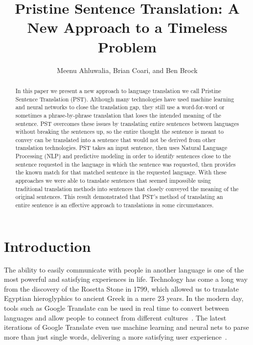 \documentclass[runningheads]{llncs}
\title{Pristine Sentence Translation: A New Approach to a Timeless Problem}
\author{
	Meenu Ahluwalia, Brian Coari, and Ben Brock
}
\institute{$^1$Master of Science in Data Science \\ Southern Methodist University \\ Dallas, Texas USA \\
	\email{\{mahluwalia, bcoari, bbrock\}@smu.edu}}
\begin{document}
	
	\maketitle
	
	\begin{abstract}
		In this paper we present a new approach to language translation we call Pristine Sentence Translation (PST). Although many technologies have used machine learning and neural networks to close the translation gap, they still use a word-for-word or sometimes a phrase-by-phrase translation that loses the intended meaning of the sentence. PST overcomes these issues by translating entire sentences between languages without breaking the sentences up, so the entire thought the sentence is meant to convey can be translated into a sentence that would not be derived from other translation technologies. PST takes an input sentence, then uses Natural Language Processing (NLP) and predictive modeling in order to identify sentences close to the sentence requested in the language in which the sentence was requested, then provides the known match for that matched sentence in the requested language. With these approaches we were able to translate sentences that seemed impossible using traditional translation methods into sentences that closely conveyed the meaning of the original sentences. This result demonstrated that PST's method of translating an entire sentence is an effective approach to translations in some circumstances.
		
	\end{abstract}
	
	
	\section{Introduction}
	
	The ability to easily communicate with people in another language is one of the most powerful and satisfying experiences in life. Technology has come a long way from the discovery of the Rosetta Stone in 1799, which allowed us to translate Egyptian hieroglyphics to ancient Greek in a mere 23 years. In the modern day, tools such as Google Translate can be used in real time to convert between languages and allow people to connect from different cultures~\cite{ref_url6}. The latest iterations of Google Translate even use machine learning and neural nets to parse more than just  single words, delivering a more satisfying user experience~\cite{ref_url7}.
	
\end{document}
